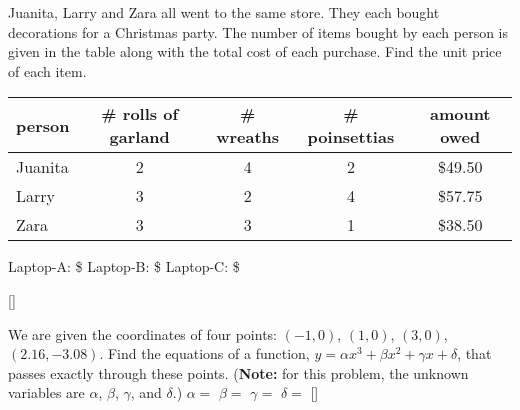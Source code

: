 \documentclass[12pt,letterpaper]{memoir}
\begin{document}
%
%
\myWideProblemWithContent
{
    Juanita, Larry and Zara all went to the same store.
    They each bought decorations for a
    Christmas party. 
    The number of items bought by each person is given in the table
    along with the total cost of each purchase. 
    Find the unit price of each item. 
    \begin{center}
        \begin{tabular}{lcccc}
            person & \# rolls of garland & \# wreaths & \# poinsettias & amount owed \\
            \toprule
            Juanita  & 2  & 4 & 2 & \$49.50  \\
            Larry    & 3  & 2 & 4 & \$57.75  \\
            Zara     & 3  & 3 & 1 & \$38.50  \\
        \end{tabular}
    \end{center}
    \mySystemTable
    \small
    Laptop-A: \$
    \hfill 
    Laptop-B: \$
    \hfill 
    Laptop-C: \$
}[\small]


%
%
\myWideProblemWithContent
{
    We are given the coordinates of four points: 
    $(-1,0)$, $(1,0)$, $(3,0)$, $(2.16,-3.08)$.
    Find the equations of a function, 
    $y = \alpha x^3 + \beta x^2 + \gamma x + \delta $, 
    that passes exactly through these points.
    ({\bfseries Note:} 
    for this problem, the unknown variables are 
    $\alpha$, $\beta$, $\gamma$, and $\delta$.)
    \vspace{2in}
    \mySystemTable
    \small
    $\alpha = $ 
    \hfill 
    $\beta = $ 
    \hfill 
    $\gamma = $ 
    \hfill 
    $\delta = $ 
}[\small]
\end{document}
